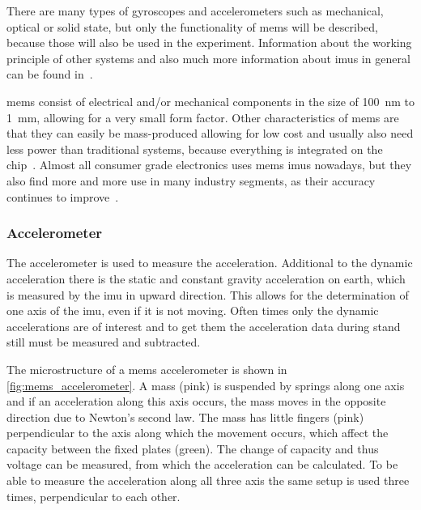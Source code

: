 There are many types of gyroscopes and accelerometers such as mechanical, optical or solid state, but only the functionality of \gls{mems} will be described, because those will also be used in the experiment.
Information about the working principle of other systems and also much more information about \glspl{imu} in general can be found in~\cite{Woodman2007}.

\gls{mems} consist of electrical and/or mechanical components in the size of \SI{100}{\nano\metre} to \SI{1}{\milli\metre}, allowing for a very small form factor.
Other characteristics of \gls{mems} are that they can easily be mass-produced allowing for low cost and usually also need less power than traditional systems, because everything is integrated on the chip~\cite{Shaeffer2013}.
Almost all consumer grade electronics uses \gls{mems} \glspl{imu} nowadays, but they also find more and more use in many industry segments, as their accuracy continues to improve~\cite{Perlmutter2016}.

\subsubsection{ Accelerometer}
The accelerometer is used to measure the acceleration.
Additional to the dynamic acceleration there is the static and constant gravity acceleration on earth, which is measured by the \gls{imu} in upward direction.
This allows for the determination of one axis of the \gls{imu}, even if it is not moving.
Often times only the dynamic accelerations are of interest and to get them the acceleration data during stand still must be measured and subtracted.

The microstructure of a \gls{mems} accelerometer is shown in \cref{fig:mems_accelerometer}.
A mass (pink) is suspended by springs along one axis and if an acceleration along this axis occurs, the mass moves in the opposite direction due to Newton's second law.
The mass has little fingers (pink) perpendicular to the axis along which the movement occurs, which affect the capacity between the fixed plates (green).
The change of capacity and thus voltage can be measured, from which the acceleration can be calculated.
To be able to measure the acceleration along all three axis the same setup is used three times, perpendicular to each other.

